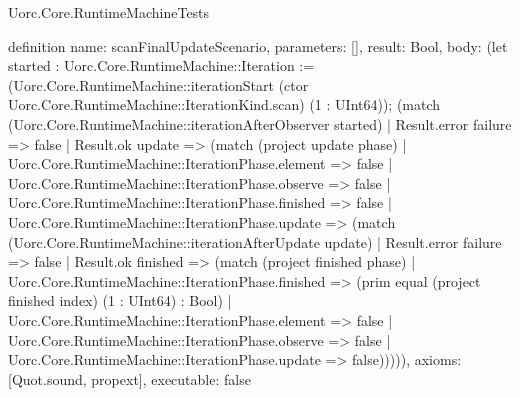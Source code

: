 \begin{lexlean}{Uorc.Core.RuntimeMachineTests}
\begin{semanticmodule}
definition{
  name: scanFinalUpdateScenario,
  parameters: [],
  result: Bool,
  body: (let started : Uorc.Core.RuntimeMachine::Iteration := (Uorc.Core.RuntimeMachine::iterationStart (ctor Uorc.Core.RuntimeMachine::IterationKind.scan) (1 : UInt64)); (match (Uorc.Core.RuntimeMachine::iterationAfterObserver started)
    | Result.error failure => false
    | Result.ok update => (match (project update phase)
      | Uorc.Core.RuntimeMachine::IterationPhase.element => false
      | Uorc.Core.RuntimeMachine::IterationPhase.observe => false
      | Uorc.Core.RuntimeMachine::IterationPhase.finished => false
      | Uorc.Core.RuntimeMachine::IterationPhase.update => (match (Uorc.Core.RuntimeMachine::iterationAfterUpdate update)
        | Result.error failure => false
        | Result.ok finished => (match (project finished phase)
          | Uorc.Core.RuntimeMachine::IterationPhase.finished => (prim equal (project finished index) (1 : UInt64) : Bool)
          | Uorc.Core.RuntimeMachine::IterationPhase.element => false
          | Uorc.Core.RuntimeMachine::IterationPhase.observe => false
          | Uorc.Core.RuntimeMachine::IterationPhase.update => false))))),
  axioms: [Quot.sound, propext],
  executable: false
}


\end{semanticmodule}
\end{lexlean}
